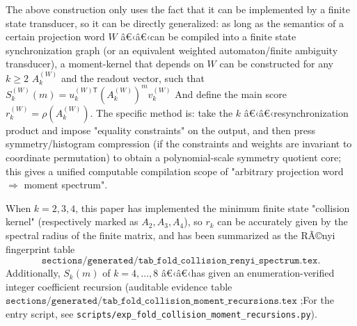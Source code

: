 \begin{remark}\label{rem:pom-moment-compiler-general-word}
The above construction only uses the fact that it can be implemented by a finite state transducer, so it can be directly generalized: as long as the semantics of a certain projection word \(W\) â€‹â€‹can be compiled into a finite state synchronization graph (or an equivalent weighted automaton/finite ambiguity transducer), a moment-kernel that depends on \(W\) can be constructed for any \(k\ge 2\)
\(
A_k^{(W)}
\)
and the readout vector, such that
\(
S_k^{(W)}(m)=u_k^{(W)\mathsf T}(A_k^{(W)})^{m}v_k^{(W)}
\)
And define the main score \(r_k^{(W)}=\rho(A_k^{(W)})\).
The specific method is: take the \(k\) â€‹â€‹resynchronization product and impose "equality constraints" on the output, and then press symmetry/histogram compression (if the constraints and weights are invariant to coordinate permutation) to obtain a polynomial-scale symmetry quotient core; this gives a unified computable compilation scope of "arbitrary projection word \(\Rightarrow\) moment spectrum".
\end{remark}

\begin{remark}[Consistency check with $k=2,3,4$ â€‹â€‹(fingerprint generated)]\label{rem:pom-ak-consistency}
When $k=2,3,4$, this paper has implemented the minimum finite state "collision kernel" (respectively marked as $A_2,A_3,A_4$), so $r_k$ can be accurately given by the spectral radius of the finite matrix, and has been summarized as the RÃ©nyi fingerprint table
\[
\texttt{sections/generated/tab\_fold\_collision\_renyi\_spectrum.tex}.
\]
Additionally, $S_k(m)$ of $k=4,\dots,8$ â€‹â€‹has given an enumeration-verified integer coefficient recursion (auditable evidence table
\(
\texttt{sections/generated/tab\_fold\_collision\_moment\_recursions.tex}
\)
;For the entry script, see \texttt{scripts/exp\_fold\_collision\_moment\_recursions.py}).
\end{remark}

